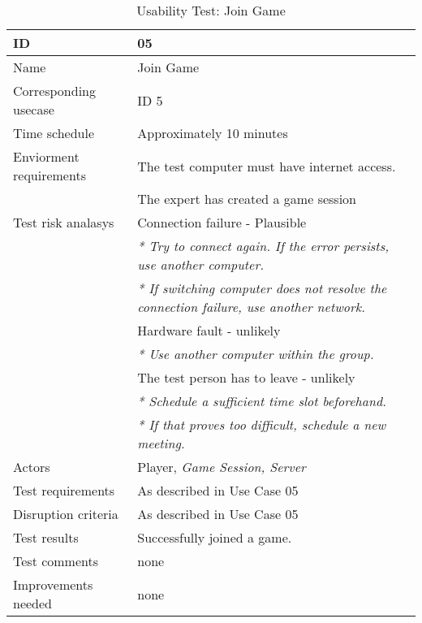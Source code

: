 {\footnotesize
\begin{table}[H]
\begin{tabular}{| p{5cm} | p{10cm} |}\hline
	\textbf{ID}	& \textbf{05} \\ \hline
	Name		& Join Game\\ \hline
	Corresponding usecase & ID 5\\ \hline
	Time schedule	& Approximately 10 minutes\\ \hline
	Enviorment requirements 
		& The test computer must have internet access. \\ 
		& The expert has created a game session\\ \hline
	Test risk analasys 
		& Connection failure - Plausible \\
		& \emph{* Try to connect again. If the error persists, use another computer.} \\
		& \emph{* If switching computer does not resolve the connection failure, use another network.}\\
		& Hardware fault - unlikely \\
		& \emph{* Use another computer within the group.} \\
		& The test person has to leave - unlikely \\
		& \emph{* Schedule a sufficient time slot beforehand.} \\
		& \emph{* If that proves too difficult, schedule a new meeting.}\\ \hline
	Actors	& Player, \emph{Game Session, Server}\\ \hline
	Test requirements & As described in Use Case 05 \\ \hline
	Disruption criteria & As described in Use Case 05  \\ \hline
	Test results & Successfully joined a game. \\ \hline
	Test comments & none \\ \hline
	Improvements needed & none \\ \hline
\end{tabular}


\caption{Usability Test: Join Game}
\label{fig:usability_test_5}
\end{table}}



